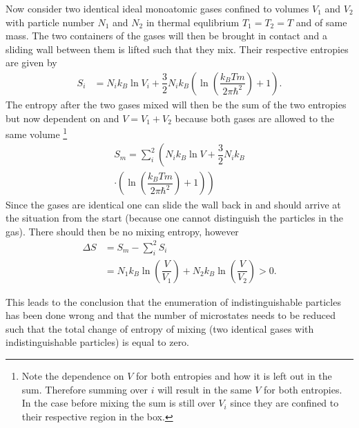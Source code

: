 \documentclass[a4paper,10pt]{article}
\numberwithin{equation}{section}
\begin{document}
\begin{multicols}{2}
Now consider two identical ideal monoatomic gases confined to volumes $V_1$ and $V_2$ with particle number $N_1$ and $N_2$ in thermal equlibrium $T_1=T_2=T$ and of same mass.
The two containers of the gases will then be brought in contact and a sliding wall between them is lifted such that they mix.
Their respective entropies are given by
\begin{align} 
  S_i &= N_ik_B\ln V_i + \dfrac{3}{2}N_ik_B\left(\ln\left(\dfrac{k_BTm}{2\pi \hbar ^2}\right) + 1\right)
.\end{align} 
The entropy after the two gases mixed will then be the sum of the two entropies but now dependent on and $V=V_1+V_2$ because both gases are allowed to the same volume
\footnote{Note the dependence on $V$ for both entropies and how it is left out in the sum.
Therefore summing over $i$ will result in the same $V$ for both entropies.
In the case before mixing the sum is still over $V_i$ since they are confined to their respective region in the box.}
\begin{multline}
  S_m  = \sum_{i}^{2}\left(N_ik_B\ln V + \dfrac{3}{2}N_ik_B\right.\\
  \cdot \left.\left(\ln\left(\dfrac{k_BTm}{2\pi \hbar ^2}\right) + 1\right)\right)
\end{multline}
Since the gases are identical one can slide the wall back in and should arrive at the situation from the start (because one cannot distinguish the particles in the gas).
There should then be no mixing entropy, however
\begin{align} 
  \Delta S &= S_m-\sum_{i}^{2}S_i\\
           &= N_1k_B\ln\left(\dfrac{V}{V_1}\right)+N_2k_B\ln\left(\dfrac{V}{V_2}\right)>0
.\end{align} 
\iffalse If the gases are identical so is their density $\tfrac{N_1}{V_1}=\tfrac{N_2}{V_2}=\text{const}$.
One can write (and leaving out the constant of proportionality denoted by star)
\begin{align} 
  \Delta S^* &= k_B\left(N_1\ln\left(\dfrac{N_1+N_2}{N_1}\right)+N_2\ln\left(\dfrac{N_1+N_2}{N_2}\right)\right)
\end{align} 
...
\fi
This leads to the conclusion that the enumeration of indistinguishable particles has been done wrong and that the number of microstates needs to be reduced such that the total change of entropy of mixing (two identical gases with indistinguishable particles) is equal to zero.


\end{multicols}
\end{document}
